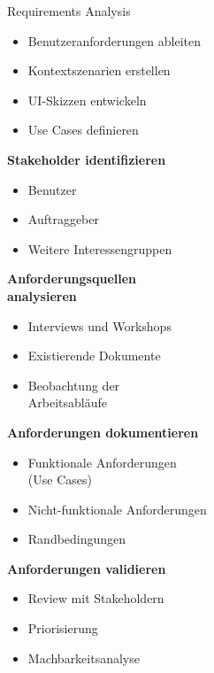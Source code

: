 \begin{KR}{Requirements Analysis}
    \begin{itemize}
        \item Benutzeranforderungen ableiten
        \item Kontextszenarien erstellen
        \item UI-Skizzen entwickeln
        \item Use Cases definieren
    \end{itemize}
    \vspace{2mm}

    \begin{minipage}[t]{0.45\linewidth}
    \textbf{Stakeholder identifizieren}
    \begin{itemize}
        \item Benutzer
        \item Auftraggeber
        \item Weitere Interessengruppen
    \end{itemize}
    
    \textbf{Anforderungsquellen \\ analysieren}
    \begin{itemize}
        \item Interviews und Workshops
        \item Existierende Dokumente
        \item Beobachtung der \\Arbeitsabläufe
    \end{itemize}
    \end{minipage}
    \begin{minipage}[t]{0.55\linewidth}    
    \textbf{Anforderungen dokumentieren}
    \begin{itemize}
        \item Funktionale Anforderungen \\ (Use Cases)
        \item Nicht-funktionale Anforderungen
        \item Randbedingungen
    \end{itemize}
    
    \textbf{Anforderungen validieren}
    \begin{itemize}
        \item Review mit Stakeholdern
        \item Priorisierung
        \item Machbarkeitsanalyse
    \end{itemize}
    \end{minipage}
\end{KR}

